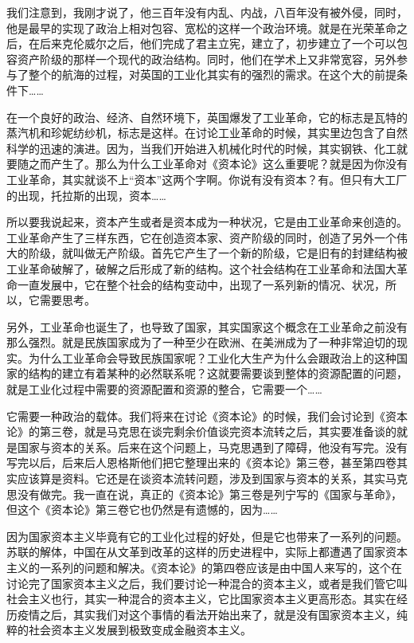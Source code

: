 \documentclass[UTF8, 12pt, a4paper]{ctexrep}
\begin{document}
我们注意到，我刚才说了，他三百年没有内乱、内战，八百年没有被外侵，同时，他是最早的实现了政治上相对包容、宽松的这样一个政治环境。就是在光荣革命之后，在后来克伦威尔之后，他们完成了君主立宪，建立了，初步建立了一个可以包容资产阶级的那样一个现代的政治结构。同时，他们在学术上又非常宽容，另外参与了整个的航海的过程，对英国的工业化其实有的强烈的需求。在这个大的前提条件下……

在一个良好的政治、经济、自然环境下，英国爆发了工业革命，它的标志是瓦特的蒸汽机和珍妮纺纱机，标志是这样。在讨论工业革命的时候，其实里边包含了自然科学的迅速的演进。因为，当我们开始进入机械化时代的时候，其实钢铁、化工就要随之而产生了。那么为什么工业革命对《资本论》这么重要呢？就是因为你没有工业革命，其实就谈不上“资本”这两个字啊。你说有没有资本？有。但只有大工厂的出现，托拉斯的出现，资本……

所以要我说起来，资本产生或者是资本成为一种状况，它是由工业革命来创造的。工业革命产生了三样东西，它在创造资本家、资产阶级的同时，创造了另外一个伟大的阶级，就叫做无产阶级。首先它产生了一个新的阶级，它是旧有的封建结构被工业革命破解了，破解之后形成了新的结构。这个社会结构在工业革命和法国大革命一直发展中，它在整个社会的结构变动中，出现了一系列新的情况、状况，所以，它需要思考。

另外，工业革命也诞生了，也导致了国家，其实国家这个概念在工业革命之前没有那么强烈。就是民族国家成为了一种至少在欧洲、在美洲成为了一种非常迫切的现实。为什么工业革命会导致民族国家呢？工业化大生产为什么会跟政治上的这种国家的结构的建立有着某种的必然联系呢？这就要需要谈到整体的资源配置的问题，就是工业化过程中需要的资源配置和资源的整合，它需要一个……

它需要一种政治的载体。我们将来在讨论《资本论》的时候，我们会讨论到《资本论》的第三卷，就是马克思在谈完剩余价值谈完资本流转之后，其实要准备谈的就是国家与资本的关系。后来在这个问题上，马克思遇到了障碍，他没有写完。没有写完以后，后来后人恩格斯他们把它整理出来的《资本论》第三卷，甚至第四卷其实应该算是资料。它还是在谈资本流转问题，涉及到国家与资本的关系，其实马克思没有做完。我一直在说，真正的《资本论》第三卷是列宁写的《国家与革命》，但这个《资本论》第三卷它也仍然是有遗憾的，因为……

因为国家资本主义毕竟有它的工业化过程的好处，但是它也带来了一系列的问题。苏联的解体，中国在从文革到改革的这样的历史进程中，实际上都遭遇了国家资本主义的一系列的问题和解决。《资本论》的第四卷应该是由中国人来写的，这个在讨论完了国家资本主义之后，我们要讨论一种混合的资本主义，或者是我们管它叫社会主义也行，其实一种混合的资本主义，它比国家资本主义更高形态。其实在经历疫情之后，其实我们对这个事情的看法开始出来了，就是没有国家资本主义，纯粹的社会资本主义发展到极致变成金融资本主义。
\end{document}
